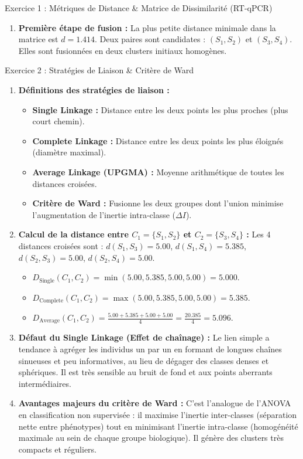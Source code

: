\documentclass[11pt,a4paper]{article}
\begin{document}
\begin{solutionbox}{Exercice 1 : Métriques de Distance \& Matrice de Dissimilarité (RT-qPCR)}
\begin{enumerate}[label=\textbf{\alph*.}]
  \item \textbf{Première étape de fusion :}
  La plus petite distance minimale dans la matrice est $d = 1.414$. Deux paires sont candidates : $(S_1, S_2)$ et $(S_3, S_4)$. Elles sont fusionnées en deux clusters initiaux homogènes.
\end{enumerate}
\end{solutionbox}

\begin{solutionbox}{Exercice 2 : Stratégies de Liaison \& Critère de Ward}
\begin{enumerate}[label=\textbf{\alph*.}]
  \item \textbf{Définitions des stratégies de liaison :}
  \begin{itemize}
    \item \textbf{Single Linkage :} Distance entre les deux points les plus proches (plus court chemin).
    \item \textbf{Complete Linkage :} Distance entre les deux points les plus éloignés (diamètre maximal).
    \item \textbf{Average Linkage (UPGMA) :} Moyenne arithmétique de toutes les distances croisées.
    \item \textbf{Critère de Ward :} Fusionne les deux groupes dont l'union minimise l'augmentation de l'inertie intra-classe ($\Delta I$).
  \end{itemize}

  \item \textbf{Calcul de la distance entre $C_1 = \{S_1, S_2\}$ et $C_2 = \{S_3, S_4\}$ :}
  Les 4 distances croisées sont : $d(S_1, S_3) = 5.00$, $d(S_1, S_4) = 5.385$, $d(S_2, S_3) = 5.00$, $d(S_2, S_4) = 5.00$.
  \begin{itemize}
    \item $D_{\text{Single}}(C_1, C_2) = \min(5.00, 5.385, 5.00, 5.00) = \mathbf{5.000}$.
    \item $D_{\text{Complete}}(C_1, C_2) = \max(5.00, 5.385, 5.00, 5.00) = \mathbf{5.385}$.
    \item $D_{\text{Average}}(C_1, C_2) = \frac{5.00 + 5.385 + 5.00 + 5.00}{4} = \frac{20.385}{4} = \mathbf{5.096}$.
  \end{itemize}

  \item \textbf{Défaut du Single Linkage (Effet de chaînage) :}
  Le lien simple a tendance à agréger les individus un par un en formant de longues chaînes sinueuses et peu informatives, au lieu de dégager des classes denses et sphériques. Il est très sensible au bruit de fond et aux points aberrants intermédiaires.

  \item \textbf{Avantages majeurs du critère de Ward :}
  C'est l'analogue de l'ANOVA en classification non supervisée : il maximise l'inertie inter-classes (séparation nette entre phénotypes) tout en minimisant l'inertie intra-classe (homogénéité maximale au sein de chaque groupe biologique). Il génère des clusters très compacts et réguliers.
\end{enumerate}
\end{solutionbox}
\end{document}
